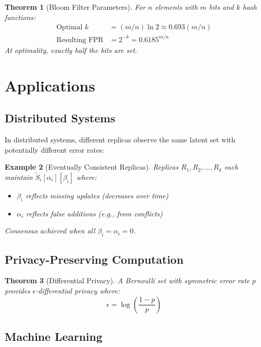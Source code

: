 \documentclass[11pt,final,hidelinks]{article}
\newtheorem{theorem}{Theorem}[section]
\newtheorem{example}[theorem]{Example}
\newcommand{\obs}[1]{\widetilde{#1}}
\newcommand{\fprate}{\alpha}
\newcommand{\fnrate}{\beta}
\begin{document}
\begin{theorem}[Bloom Filter Parameters]
For $n$ elements with $m$ bits and $k$ hash functions:
\begin{align}
\text{Optimal } k &= (m/n)\ln 2 \approx 0.693(m/n) \\
\text{Resulting FPR} &= 2^{-k} = 0.6185^{m/n}
\end{align}
At optimality, exactly half the bits are set.
\end{theorem}

\section{Applications}

\subsection{Distributed Systems}

In distributed systems, different replicas observe the same latent set with potentially different error rates:

\begin{example}[Eventually Consistent Replicas]
Replicas $R_1, R_2, ..., R_k$ each maintain $\obs{S}_i[\fprate_i][\fnrate_i]$ where:
\begin{itemize}
\item $\fnrate_i$ reflects missing updates (decreases over time)
\item $\fprate_i$ reflects false additions (e.g., from conflicts)
\end{itemize}
Consensus achieved when all $\fnrate_i = \fprate_i = 0$.
\end{example}

\subsection{Privacy-Preserving Computation}

\begin{theorem}[Differential Privacy]
A Bernoulli set with symmetric error rate $p$ provides $\epsilon$-differential privacy where:
\begin{equation}
\epsilon = \log\left(\frac{1-p}{p}\right)
\end{equation}
\end{theorem}

\subsection{Machine Learning}
\end{document}
